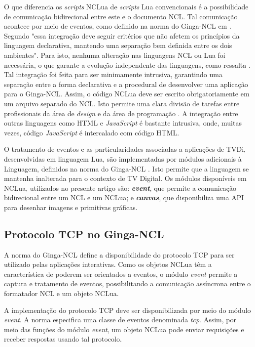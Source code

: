 O que diferencia os \textit{scripts} NCLua de \textit{scripts} Lua convencionais é a possibilidade de comunicação
bidirecional entre este e o documento NCL. Tal comunicação acontece por meio de eventos, como definido
na norma do Ginga-NCL em \cite{abnt200815606}. Segundo \cite{sant2008nclua} 
"essa integração deve seguir critérios que não afetem os princípios da linguagem declarativa, mantendo uma separação bem definida 
entre os dois ambientes". Para isto, nenhuma alteração nas linguagens NCL ou Lua foi necessária, o que garante a evolução
independente das linguagens, como ressalta \cite{sant2008nclua}. 
Tal integração foi feita para ser minimamente intrusiva,
garantindo uma separação entre a forma declarativa e a procedural de desenvolver uma aplicação para o Ginga-NCL.
Assim, o código NCLua deve ser escrito obrigatoriamente em um arquivo separado do NCL. 
Isto permite uma clara divisão de tarefas entre profissionais da área de \textit{design} e da área de programação \cite{sant2008nclua}.
A integração entre outras linguagens como HTML e \textit{JavaScript} é bastante intrusiva, onde, muitas vezes, código \textit{JavaScript} é intercalado
com código HTML.

O tratamento de eventos e as particularidades associadas a aplicações de TVDi, desenvolvidas em linguagem Lua, 
são implementadas por módulos adicionais à Linguagem, definidos na norma do Ginga-NCL \cite{abnt200815606}.
Isto permite que a linguagem se mantenha inalterada para o contexto de TV Digital. 
Os módulos disponíveis em NCLua, utilizados no presente artigo são: \textbf{\textit{event}}, 
que permite a comunicação bidirecional entre um NCL e um NCLua;
e \textbf{\textit{canvas}}, que disponibiliza uma API para desenhar imagens e primitivas gráficas.

\subsection{Protocolo TCP no Ginga-NCL} \label{sec:tcp}

A norma do Ginga-NCL \cite{abnt200815606} define a disponibilidade do protocolo TCP para ser utilizado pelas aplicações interativas.
Como os objetos NCLua têm a característica de poderem ser orientados a eventos, o módulo \textit{event} permite a captura e tratamento de eventos, possibilitando a comunicação assíncrona entre o formatador NCL e um objeto NCLua.

A implementação do protocolo TCP deve ser disponibilizada por meio do módulo \textit{event}. A norma especifica uma classe de eventos 
denominada \textit{tcp}. Assim, por meio das funções do módulo \textit{event}, um objeto NCLua pode enviar 
requisições e receber respostas usando tal protocolo.

